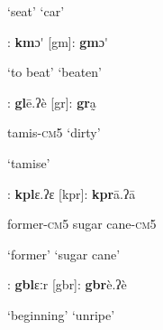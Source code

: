 \begin{styleindexi}
                      ‘seat’                                                ‘car’  
\end{styleindexi}

\begin{styleindexi}
          [km]:      \textbf{km}ɔ\'{}                                      [gm]:      \textbf{gm}ɔ\'{}        
\end{styleindexi}

\begin{styleindexi}
                      ‘to beat’                                            ‘beaten’  
\end{styleindexi}

\begin{styleindexi}
          [gl]:       \textbf{gl}ē.ʔè                                     [gr]:       \textbf{gr}a̰     
\end{styleindexi}

\begin{styleindexi}
                      tamis-\textsc{cm}5                                        ‘dirty’
\end{styleindexi}

\begin{styleindexi}
                      ‘tamise’
\end{styleindexi}

\begin{styleindexi}
           [kpl]:      \textbf{kpl}ɛ.ʔɛ                                  [kpr]:     \textbf{kpr}ā.ʔā         
\end{styleindexi}

\begin{styleindexi}
                      former-\textsc{cm}5                                      sugar cane-\textsc{cm}5
\end{styleindexi}

\begin{styleindexi}
                      ‘former’                                            ‘sugar cane’
\end{styleindexi}

\begin{styleindexi}
          [gbl]:     \textbf{gbl}ɛːr                                   [gbr]:     \textbf{gbr}è.ʔè   
\end{styleindexi}

\begin{styleindexi}
                      ‘beginning’                                        ‘unripe’ 
\end{styleindexi}

